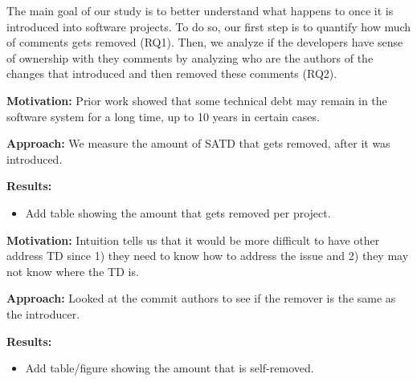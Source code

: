 The main goal of our study is to better understand what happens to \SATD once it is introduced into software projects. To do so, our first step is to quantify how much of \SATD comments gets removed (RQ1). Then, we analyze if the developers have sense of ownership with they \SATD comments by analyzing who are the authors of the changes that introduced and then removed these \SATD comments (RQ2). 

\vspace{3mm}
\noindent\rqi
\vspace{3mm}

\noindent \textbf{Motivation:} 
Prior work showed that some technical debt may remain in the software system for a long time, up to 10 years in certain cases. 

\vspace{1mm}
\noindent \textbf{Approach:} 
We measure the amount of SATD that gets removed, after it was introduced.

\vspace{1mm}
\noindent \textbf{Results:} 

\begin{itemize}
\item Add table showing the amount that gets removed per project.
\end{itemize}


\vspace{3mm}
\noindent\rqii
\vspace{3mm}

\noindent \textbf{Motivation:} 
Intuition tells us that it would be more difficult to have other address TD since 1) they need to know how to address the issue and 2) they may not know where the TD is.

\vspace{1mm}
\noindent \textbf{Approach:} 
Looked at the commit authors to see if the remover is the same as the introducer.

\vspace{1mm}
\noindent \textbf{Results:} 
\begin{itemize}
\item Add table/figure showing the amount that is self-removed.
\end{itemize}



\vspace{3mm}
\noindent\rqiii
\vspace{3mm}

